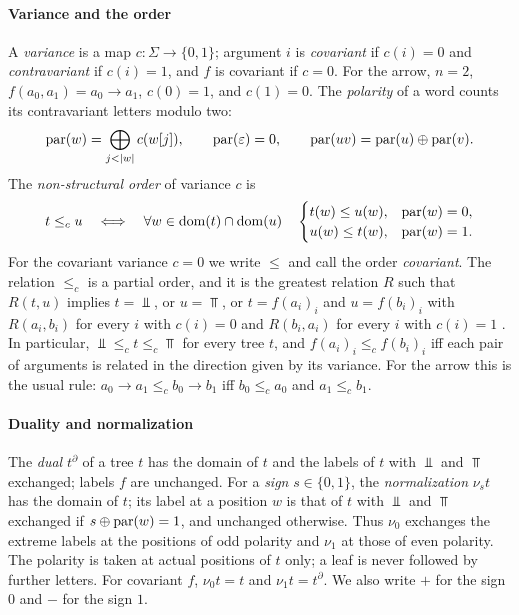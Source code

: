 \paragraph{Variance and the order}
A \emph{variance} is a map $c:\Sigma\to\{0,1\}$; argument $i$ is
\emph{covariant} if $c(i)=0$ and \emph{contravariant} if $c(i)=1$, and $f$ is
covariant if $c=0$. For the arrow, $n=2$, $f(a_0,a_1)=a_0\to a_1$, $c(0)=1$, and
$c(1)=0$. The \emph{polarity} of a word counts its contravariant letters modulo
two:
\begin{equation}\label{eq:bg-polarity}
 \operatorname{par}(w)=\bigoplus_{j<\lvert w\rvert}c(w[j]),\qquad \operatorname{par}(\varepsilon)=0,\qquad
 \operatorname{par}(uv)=\operatorname{par}(u)\oplus\operatorname{par}(v).
\end{equation}
The \emph{non-structural order} of variance $c$ is
\begin{equation}\label{eq:bg-order}
 t\le_c u\quad\Longleftrightarrow\quad
 \forall w\in\operatorname{dom}(t)\cap\operatorname{dom}(u)\quad
 \begin{cases}t(w)\le u(w),&\operatorname{par}(w)=0,\\ u(w)\le t(w),&\operatorname{par}(w)=1.\end{cases}
\end{equation}
For the covariant variance $c=0$ we write $\le$ and call the order
\emph{covariant}. The relation $\le_c$ is a partial order, and it is the
greatest relation $R$ such that $R(t,u)$ implies $t=\Bot$, or $u=\Top$, or
$t=f(a_i)_i$ and $u=f(b_i)_i$ with $R(a_i,b_i)$ for every $i$ with $c(i)=0$ and
$R(b_i,a_i)$ for every $i$ with $c(i)=1$
. In particular,
$\Bot\le_c t\le_c\Top$ for every tree $t$, and
$f(a_i)_i\le_c f(b_i)_i$ iff each pair of arguments is related in the direction
given by its variance. For the arrow this is the usual rule:
$a_0\to a_1\le_c b_0\to b_1$ iff $b_0\le_c a_0$ and $a_1\le_c b_1$.

\paragraph{Duality and normalization}
The \emph{dual} $t^{\partial}$ of a tree $t$ has the domain of $t$ and the labels of
$t$ with $\Bot$ and $\Top$ exchanged; labels $f$ are unchanged. For a
\emph{sign} $s\in\{0,1\}$, the \emph{normalization} $\nu_s t$ has the domain of
$t$; its label at a position $w$ is that of $t$ with $\Bot$ and $\Top$ exchanged
if $s\oplus\operatorname{par}(w)=1$, and unchanged otherwise. Thus $\nu_0$ exchanges the
extreme labels at the positions of odd polarity and $\nu_1$ at those of even
polarity. The polarity is taken at actual positions of $t$ only; a leaf is
never followed by further letters. For covariant $f$, $\nu_0t=t$ and
$\nu_1t=t^{\partial}$. We also write $+$ for the sign $0$ and $-$ for the sign $1$.

